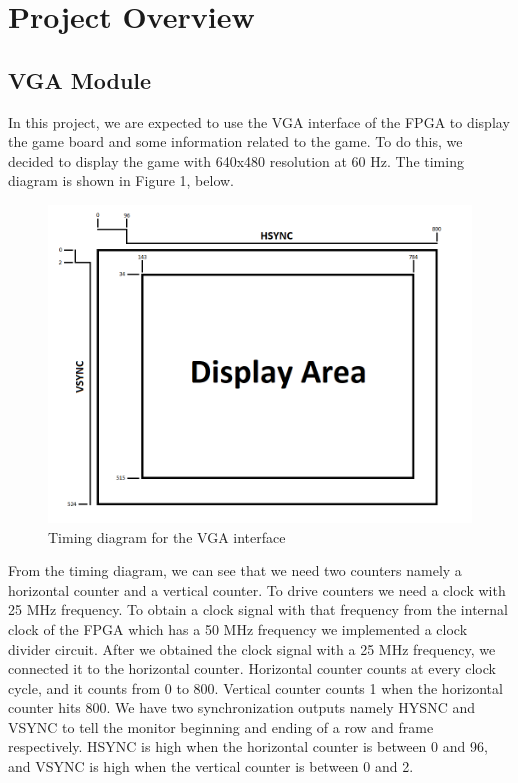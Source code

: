 \documentclass[conference]{IEEEtran}
\begin{document}
\section{Project Overview}
\subsection{VGA Module}
In this project, we are expected to use the VGA interface of the FPGA to display the game board and some information related to the game. 
To do this, we decided to display the game with 640x480 resolution at 60 Hz. \cite{vga} The timing diagram is shown in Figure 1, below.
\begin{figure}[H]
  \centerline{\includegraphics[scale=0.4]{vga.png}}
   \caption{Timing diagram for the VGA interface}
\end{figure} 
From the timing diagram, we can see that we need two counters namely a horizontal counter and a vertical counter.
To drive counters we need a clock with 25 MHz frequency. 
To obtain a clock signal with that frequency from the internal clock of the FPGA which has a 50 MHz frequency we implemented a clock divider circuit. 
After we obtained the clock signal with a 25 MHz frequency, we connected it to the horizontal counter. 
Horizontal counter counts at every clock cycle, and it counts from 0 to 800. Vertical counter counts 1 when the horizontal counter hits 800. 
We have two synchronization outputs namely HYSNC and VSYNC to tell the monitor beginning and ending of a row and frame respectively. 
HSYNC is high when the horizontal counter is between 0 and 96, and VSYNC is high when the vertical counter is between 0 and 2. 
\end{document}
